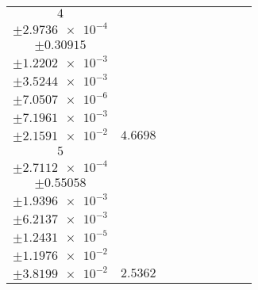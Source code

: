 \documentclass[8pt]{article}
\begin{document}
\begin{longtable}[l]{c c c c c c c c c}
$\num{4}$ & \begin{tabular}[c]{@{}c@{}}$\num{5.7478e-2}$ \\ $\pm\num{2.9736e-4}$\end{tabular} & \begin{tabular}[c]{@{}c@{}}$\num{-0.37382}$ \\ $\pm\num{0.30915}$\end{tabular} & \begin{tabular}[c]{@{}c@{}}$\num{0.49663}$ \\ $\pm\num{1.2202e-3}$\end{tabular} & \begin{tabular}[c]{@{}c@{}}$\num{3.548e+3}$ \\ $\pm\num{3.5244e-3}$\end{tabular} & \begin{tabular}[c]{@{}c@{}}$\num{7.0979}$ \\ $\pm\num{7.0507e-6}$\end{tabular} & \begin{tabular}[c]{@{}c@{}}$\num{1.3109}$ \\ $\pm\num{7.1961e-3}$\end{tabular} & \begin{tabular}[c]{@{}c@{}}$\num{4.3063}$ \\ $\pm\num{2.1591e-2}$\end{tabular} & $\num{4.6698}$\\
$\num{5}$ & \begin{tabular}[c]{@{}c@{}}$\num{2.9565e-2}$ \\ $\pm\num{2.7112e-4}$\end{tabular} & \begin{tabular}[c]{@{}c@{}}$\num{1.6459}$ \\ $\pm\num{0.55058}$\end{tabular} & \begin{tabular}[c]{@{}c@{}}$\num{6.9252}$ \\ $\pm\num{1.9396e-3}$\end{tabular} & \begin{tabular}[c]{@{}c@{}}$\num{3.5544e+3}$ \\ $\pm\num{6.2137e-3}$\end{tabular} & \begin{tabular}[c]{@{}c@{}}$\num{7.1107}$ \\ $\pm\num{1.2431e-5}$\end{tabular} & \begin{tabular}[c]{@{}c@{}}$\num{1.1676}$ \\ $\pm\num{1.1976e-2}$\end{tabular} & \begin{tabular}[c]{@{}c@{}}$\num{4.2053}$ \\ $\pm\num{3.8199e-2}$\end{tabular} & $\num{2.5362}$\\

\end{longtable}
\end{document}
